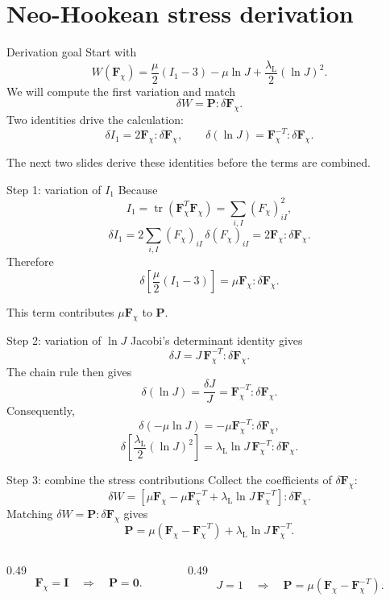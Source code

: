 \documentclass[aspectratio=169,11pt]{beamer}
\newcommand{\I}{\bm{I}}
\newcommand{\Fdef}{\bm{F}_{\chi}}
\newcommand{\Pten}{\bm{P}}
\begin{document}
\section{Neo-Hookean stress derivation}

\begin{frame}{Derivation goal}
Start with
\[
  W(\Fdef)
  =
  \frac{\mu}{2}(I_1-3)
  -\mu\ln J
  +\frac{\lambda_{\mathrm L}}{2}(\ln J)^2.
\]
We will compute the first variation and match
\[
  \delta W=\Pten:\delta\Fdef.
\]
Two identities drive the calculation:
\[
  \delta I_1
  =
  2\Fdef:\delta\Fdef,
  \qquad
  \delta(\ln J)
  =
  \Fdef^{-T}:\delta\Fdef.
\]
\begin{punchbox}
\small
The next two slides derive these identities before the terms are combined.
\end{punchbox}
\end{frame}

\begin{frame}{Step 1: variation of \(I_1\)}
Because
\[
  I_1
  =
  \operatorname{tr}(\Fdef^T\Fdef)
  =
  \sum_{i,I}(F_\chi)_{iI}^2,
\]
\[
  \delta I_1
  =
  2\sum_{i,I}
  (F_\chi)_{iI}\,
  \delta(F_\chi)_{iI}
  =
  \boxed{
  2\Fdef:\delta\Fdef
  }.
\]
Therefore
\[
  \delta\left[
  \frac{\mu}{2}(I_1-3)
  \right]
  =
  \mu\Fdef:\delta\Fdef.
\]
\begin{punchbox}
\small
This term contributes \(\mu\Fdef\) to \(\Pten\).
\end{punchbox}
\end{frame}

\begin{frame}{Step 2: variation of \(\ln J\)}
Jacobi's determinant identity gives
\[
  \delta J
  =
  J\,\Fdef^{-T}:\delta\Fdef.
\]
The chain rule then gives
\[
  \boxed{
  \delta(\ln J)
  =
  \frac{\delta J}{J}
  =
  \Fdef^{-T}:\delta\Fdef
  }.
\]
Consequently,
\[
  \delta(-\mu\ln J)
  =
  -\mu\Fdef^{-T}:\delta\Fdef,
\]
\[
  \delta\left[
  \frac{\lambda_{\mathrm L}}{2}(\ln J)^2
  \right]
  =
  \lambda_{\mathrm L}\ln J\,
  \Fdef^{-T}:\delta\Fdef.
\]
\end{frame}

\begin{frame}{Step 3: combine the stress contributions}
Collect the coefficients of \(\delta\Fdef\):
\[
  \delta W
  =
  \left[
    \mu\Fdef
    -\mu\Fdef^{-T}
    +\lambda_{\mathrm L}\ln J\,\Fdef^{-T}
  \right]
  :\delta\Fdef.
\]
Matching \(\delta W=\Pten:\delta\Fdef\) gives
\[
  \boxed{
  \Pten
  =
  \mu(\Fdef-\Fdef^{-T})
  +\lambda_{\mathrm L}\ln J\,\Fdef^{-T}
  }.
\]
\begin{columns}[T,onlytextwidth]
\begin{column}{0.49\textwidth}
\[
  \Fdef=\I
  \quad\Rightarrow\quad
  \Pten=\bm{0}.
\]
\end{column}
\begin{column}{0.49\textwidth}
\[
  J=1
  \quad\Rightarrow\quad
  \Pten=\mu(\Fdef-\Fdef^{-T}).
\]
\end{column}
\end{columns}
\end{frame}
\end{document}
